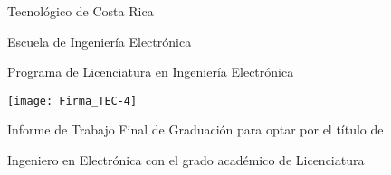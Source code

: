 
\thispagestyle{empty} 

\begin{center}

Tecnológico de Costa Rica

\par\vspace{1ex}

Escuela de Ingeniería Electrónica

\par\vspace{1ex}

Programa de Licenciatura en Ingeniería Electrónica

\par\vspace{20mm}

\texttt{[image: Firma\_TEC-4]}

\par\vspace*{\fill}

{\large\bf{\thesisTitle}}

\par\vspace*{\fill}

Informe de Trabajo Final de Graduación para optar por el título de

Ingeniero en Electrónica con el grado académico de Licenciatura

\par\vspace{20mm}

\thesisAuthor

\vspace*{\fill}

\end{center}
\newpage 
\cleardoublepage 


